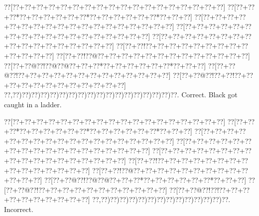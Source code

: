 \documentclass[a5paper]{article}
\begin{document}
\begin{center}
{\goo
\0??[\0??+\0??+\0??+\0??+\0??+\0??+\0??+\0??+\0??+\0??+\0??+\0??+\0??+\0??+\0??+\0??+\0??+\0??]
\0??[\0??+\0??+\0??*\0??+\0??+\0??+\0??+\0??+\0??*\0??+\0??+\0??+\0??+\0??+\0??*\0??+\0??+\0??]
\0??[\0??+\0??+\0??+\0??+\0??+\0??+\0??+\0??+\0??+\0??+\0??+\0??+\0??+\0??+\0??+\0??+\0??+\0??]
\0??[\0??+\0??+\0??+\0??+\0??+\0??+\0??+\0??+\0??+\0??+\0??+\0??+\0??+\0??+\0??+\0??+\0??+\0??]
\0??[\0??+\0??+\0??+\0??+\0??+\0??+\0??+\0??+\0??+\0??+\0??+\0??+\0??+\0??+\0??+\0??+\0??]
\0??[\0??+\0??!\0??+\0??+\0??+\0??+\0??+\0??+\0??+\0??+\0??+\0??+\0??+\0??+\0??]
\0??[\0??+\0??!\0??@\0??+\0??+\0??+\0??+\0??+\0??+\0??+\0??+\0??+\0??+\0??+\0??+\0??]
\0??[\0??+\0??@\0??!\0??@\0??@\0??+\0??+\0??*\0??+\0??+\0??+\0??+\0??+\0??*\0??+\0??+\0??]
\0??[\0??+\0??@\0??!\0??+\0??+\0??+\0??+\0??+\0??+\0??+\0??+\0??+\0??+\0??+\0??+\0??]
\0??[\0??+\0??@\0??!\0??+\0??!\0??+\0??+\0??+\0??+\0??+\0??+\0??+\0??+\0??+\0??+\0??+\0??]
\0??,\0??)\0??)\0??)\0??)\0??)\0??)\0??)\0??)\0??)\0??)\0??)\0??)\0??)\0??)\0??)\0??)\0??)\0??.
}
Correct. Black got caught in a ladder.

\end{center}
\begin{center}
{\goo
\0??[\0??+\0??+\0??+\0??+\0??+\0??+\0??+\0??+\0??+\0??+\0??+\0??+\0??+\0??+\0??+\0??+\0??+\0??]
\0??[\0??+\0??+\0??*\0??+\0??+\0??+\0??+\0??+\0??*\0??+\0??+\0??+\0??+\0??+\0??*\0??+\0??+\0??]
\0??[\0??+\0??+\0??+\0??+\0??+\0??+\0??+\0??+\0??+\0??+\0??+\0??+\0??+\0??+\0??+\0??+\0??+\0??]
\0??[\0??+\0??+\0??+\0??+\0??+\0??+\0??+\0??+\0??+\0??+\0??+\0??+\0??+\0??+\0??+\0??+\0??+\0??]
\0??[\0??+\0??+\0??+\0??+\0??+\0??+\0??+\0??+\0??+\0??+\0??+\0??+\0??+\0??+\0??+\0??+\0??+\0??]
\0??[\0??+\0??!\0??+\0??+\0??+\0??+\0??+\0??+\0??+\0??+\0??+\0??+\0??+\0??+\0??+\0??+\0??]
\0??[\0??+\0??!\0??@\0??+\0??+\0??+\0??+\0??+\0??+\0??+\0??+\0??+\0??+\0??+\0??+\0??]
\0??[\0??+\0??@\0??!\0??@\0??@\0??+\0??+\0??*\0??+\0??+\0??+\0??+\0??+\0??*\0??+\0??+\0??]
\0??[\0??+\0??@\0??!\0??+\0??+\0??+\0??+\0??+\0??+\0??+\0??+\0??+\0??+\0??]
\0??[\0??+\0??@\0??!\0??!\0??+\0??+\0??+\0??+\0??+\0??+\0??+\0??+\0??+\0??]
\0??,\0??)\0??)\0??)\0??)\0??)\0??)\0??)\0??)\0??)\0??)\0??)\0??)\0??)\0??.
}
Incorrect. 

\end{center}
\end{document}
